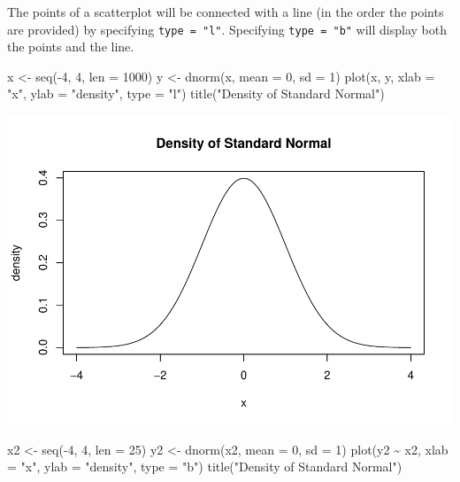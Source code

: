 \documentclass[
]{article}
\newenvironment{Shaded}{\begin{snugshade}}{\end{snugshade}}
\newcommand{\AttributeTok}[1]{\textcolor[rgb]{0.77,0.63,0.00}{#1}}
\newcommand{\DecValTok}[1]{\textcolor[rgb]{0.00,0.00,0.81}{#1}}
\newcommand{\FunctionTok}[1]{\textcolor[rgb]{0.00,0.00,0.00}{#1}}
\newcommand{\NormalTok}[1]{#1}
\newcommand{\OtherTok}[1]{\textcolor[rgb]{0.56,0.35,0.01}{#1}}
\newcommand{\SpecialCharTok}[1]{\textcolor[rgb]{0.00,0.00,0.00}{#1}}
\newcommand{\StringTok}[1]{\textcolor[rgb]{0.31,0.60,0.02}{#1}}
\begin{document}
The points of a scatterplot will be connected with a line (in the order
the points are provided) by specifying \texttt{type\ =\ "l"}. Specifying
\texttt{type\ =\ "b"} will display both the points and the line.

\begin{Shaded}
\begin{Highlighting}[]
\NormalTok{x }\OtherTok{\textless{}{-}} \FunctionTok{seq}\NormalTok{(}\SpecialCharTok{{-}}\DecValTok{4}\NormalTok{, }\DecValTok{4}\NormalTok{, }\AttributeTok{len =} \DecValTok{1000}\NormalTok{)}
\NormalTok{y }\OtherTok{\textless{}{-}} \FunctionTok{dnorm}\NormalTok{(x, }\AttributeTok{mean =} \DecValTok{0}\NormalTok{, }\AttributeTok{sd =} \DecValTok{1}\NormalTok{)}
\FunctionTok{plot}\NormalTok{(x, y, }\AttributeTok{xlab =} \StringTok{"x"}\NormalTok{, }\AttributeTok{ylab =} \StringTok{"density"}\NormalTok{, }\AttributeTok{type =} \StringTok{"l"}\NormalTok{)}
\FunctionTok{title}\NormalTok{(}\StringTok{"Density of Standard Normal"}\NormalTok{)}
\end{Highlighting}
\end{Shaded}

\includegraphics{crash-course-in-r_files/figure-latex/unnamed-chunk-22-1.pdf}

\begin{Shaded}
\begin{Highlighting}[]
\NormalTok{x2 }\OtherTok{\textless{}{-}} \FunctionTok{seq}\NormalTok{(}\SpecialCharTok{{-}}\DecValTok{4}\NormalTok{, }\DecValTok{4}\NormalTok{, }\AttributeTok{len =} \DecValTok{25}\NormalTok{)}
\NormalTok{y2 }\OtherTok{\textless{}{-}} \FunctionTok{dnorm}\NormalTok{(x2, }\AttributeTok{mean =} \DecValTok{0}\NormalTok{, }\AttributeTok{sd =} \DecValTok{1}\NormalTok{)}
\FunctionTok{plot}\NormalTok{(y2 }\SpecialCharTok{\textasciitilde{}}\NormalTok{ x2, }\AttributeTok{xlab =} \StringTok{"x"}\NormalTok{, }\AttributeTok{ylab =} \StringTok{"density"}\NormalTok{, }\AttributeTok{type =} \StringTok{"b"}\NormalTok{)}
\FunctionTok{title}\NormalTok{(}\StringTok{"Density of Standard Normal"}\NormalTok{)}
\end{Highlighting}
\end{Shaded}
\end{document}
